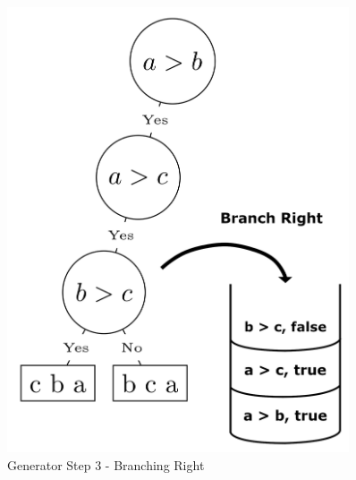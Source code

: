 \documentclass[final]{beamer}
\newlength{\sepwid}
\newlength{\onecolwid}
\newlength{\twocolwid}
\newlength{\onecolwidmid}
\begin{document}
\begin{frame}[t]
\begin{columns}[t]
\begin{column}{\twocolwid}
\begin{columns}[c,totalwidth=\twocolwid]
\begin{column}{\onecolwidmid}
\begin{figure}
\includegraphics[width=0.8\linewidth]{figures/bubble_sort_step_3_formatted.png}
\caption{Generator Step 3 - Branching Right}
\label{generator:3}
\end{figure}


\end{column} %

\end{columns} %

\end{column} %

\begin{column}{\sepwid}\end{column} %

\begin{column}{\onecolwid} %



\end{column}
\end{columns}
\end{frame}
\end{document}
